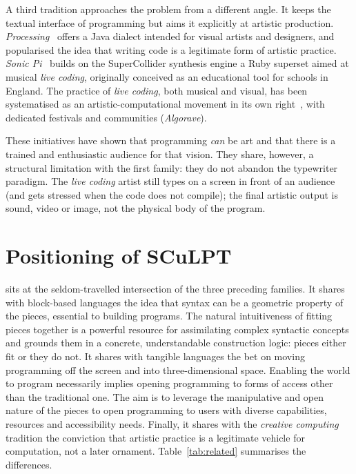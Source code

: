 A third tradition approaches the problem from a different angle.
It keeps the textual interface of programming but aims it explicitly at artistic production.
\emph{Processing}~\cite{reas07} offers a Java dialect intended for visual artists and designers, and popularised the idea that writing code is a legitimate form of artistic practice.
\emph{Sonic Pi}~\cite{aaron16} builds on the SuperCollider synthesis engine a Ruby superset aimed at musical \emph{live coding}, originally conceived as an educational tool for schools in England.
The practice of \emph{live coding}, both musical and visual, has been systematised as an artistic-computational movement in its own right~\cite{collins03}, with dedicated festivals and communities (\eg \emph{Algorave}).

These initiatives have shown that programming \emph{can} be art and that there is a trained and enthusiastic audience for that vision.
They share, however, a structural limitation with the first family: they do not abandon the typewriter paradigm.
The \emph{live coding} artist still types on a screen in front of an audience (and gets stressed when the code does not compile); the final artistic output is sound, video or image, not the physical body of the program.

\section{Positioning of SCuLPT}
\label{sec:related:positioning}

\sculpt sits at the seldom-travelled intersection of the three preceding families.
It shares with block-based languages the idea that syntax can be a geometric property of the pieces, essential to building programs.
The natural intuitiveness of fitting pieces together is a powerful resource for assimilating complex syntactic concepts and grounds them in a concrete, understandable construction logic: pieces either fit or they do not.
It shares with tangible languages the bet on moving programming off the screen and into three-dimensional space.
Enabling the world to program necessarily implies opening programming to forms of access other than the traditional one.
The aim is to leverage the manipulative and open nature of the pieces to open programming to users with diverse capabilities, resources and accessibility needs.
Finally, it shares with the \emph{creative computing} tradition the conviction that artistic practice is a legitimate vehicle for computation, not a later ornament.
Table~\ref{tab:related} summarises the differences.

